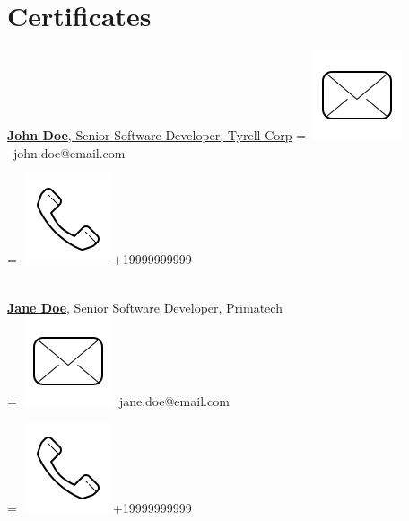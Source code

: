 \documentclass[]{plushcv}
\begin{document}
\begin{minipage}[t]{0.25\textwidth}
\section{Certificates} 
\href{https://www.linkedin.com/company/john-doe/}{\textbf{John Doe}, Senior Software Developer, Tyrell Corp}
\begingroup
{}=\hbox{
\includegraphics[scale=0.1,trim={0 1cm 0cm 0cm}]{icons/main/mail.png}\hspace{0.3cm} john.doe@email.com
}
\parbox{\wd0}{}
\endgroup
\begingroup
{}=\hbox{
\includegraphics[scale=0.1,trim={0 1.25cm -0.4cm 0cm}]{icons/main/phone.png}\hspace{0.3cm}+19999999999
}
\parbox{\wd0}{}\endgroup
\\
\sectionsep
\href{https://www.linkedin.com/company/john-doe/}{\textbf{Jane Doe}}, Senior Software Developer, Primatech 
\\
\begingroup
{}=\hbox{
\includegraphics[scale=0.1,trim={0 1cm 0cm 0cm}]{icons/main/mail.png}\hspace{0.3cm} jane.doe@email.com
}
\parbox{\wd0}{}
\endgroup
\begingroup
{}=\hbox{
\includegraphics[scale=0.1,trim={0 1.25cm -0.4cm 0cm}]{icons/main/phone.png}\hspace{0.3cm}+19999999999
}
\parbox{\wd0}{}\endgroup
\sectionsep



\end{minipage}
\end{document}
